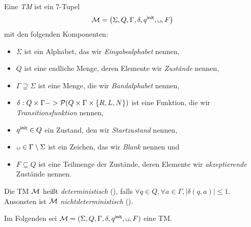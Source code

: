 \begin{Def}[name={[\acf{TM}]}]\label{def:4.tm}
	Eine \emph{\acf{TM}} ist ein 7-Tupel
	\begin{equation*}
		\M=\left(\Sigma,Q,\Gamma,\delta,\qinit,\blank,F\right)
	\end{equation*}
	mit den folgenden Komponenten:
	\begin{itemize}
		\item $\Sigma$ ist ein Alphabet, das wir \emph{Eingabealphabet} nennen,
		\item $Q$ ist eine endliche Menge, deren Elemente wir \emph{Zustände} nennen,
		\item $\Gamma\supsetneq\Sigma$ ist eine Menge, die wir \emph{Bandalphabet} nennen,
		\item $\delta: Q\times\Gamma\--> \mathcal{P}(Q\times\Gamma\times\{R,L,N\})$ ist eine Funktion, die wir \emph{Transitionsfunktion} nennen,
		\item $q^\mathsf{init}\in Q$ ein Zustand, den wir \emph{Startzustand} nennen,
		\item $\blank\in\Gamma\setminus\Sigma$ ist ein Zeichen, das wir \emph{Blank} nennen und
		\item $F\subseteq Q$ ist eine Teilmenge der Zustände, deren Elemente wir \emph{akzeptierende} Zustände nennen.
	\end{itemize}
	Die \ac{TM} $\mathcal{M}$ heißt \emph{deterministisch}
	(), falls $\forall q\in Q, \forall a\in\Gamma, |\delta
	(q,a)| \le 1$.
	Ansonsten ist $\mathcal{M}$ \emph{nichtdeterministisch} ().
\end{Def}


Im Folgenden sei $\M=(\Sigma, Q, \Gamma, \delta, \qinit, \blank, F)$ eine \ac{TM}.


